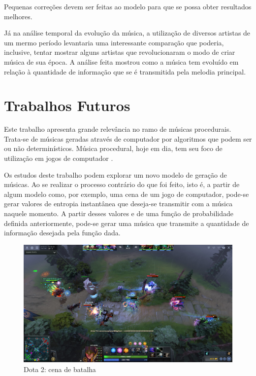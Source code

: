 Pequenas correções devem ser feitas ao modelo para que se possa obter resultados melhores.

Já na análise temporal da evolução da música, a utilização de diversos artistas de um mermo período levantaria uma interessante comparação que poderia, inclusive, tentar mostrar alguns artistas que revolucionaram o modo de criar música de sua época. A análise feita mostrou como a música tem evoluído em relação à quantidade de informação que se é transmitida pela melodia principal.

\section{Trabalhos Futuros}

Este trabalho apresenta grande relevância no ramo de músicas procedurais. Trata-se de músicas geradas através de computador por algoritmos que podem ser ou não determinísticos. Música procedural, hoje em dia, tem seu foco de utilização em jogos de computador \cite{procedural}.

Os estudos deste trabalho podem explorar um novo modelo de geração de músicas. Ao se realizar o processo contrário do que foi feito, isto é, a partir de algum modelo como, por exemplo, uma cena de um jogo de computador, pode-se gerar valores de entropia instantânea que deseja-se transmitir com a música naquele momento. A partir desses valores e de uma função de probabilidade definida anteriormente, pode-se gerar uma música que transmite a quantidade de informação desejada pela função dada.

\begin{figure}[h]
    \centering
    \includegraphics[width=\textwidth]{Cap4/dota.jpg}
    \caption{Dota 2: cena de batalha}
    \label{fig:dota}
\end{figure}

